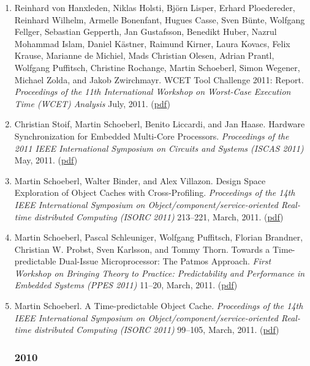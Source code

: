 \begin{enumerate}
\item Reinhard von Hanxleden, Niklas Holsti, Bj{\"o}rn Lisper, Erhard Ploedereder, Reinhard Wilhelm, Armelle Bonenfant, Hugues Casse, Sven B{\"u}nte, Wolfgang Fellger, Sebastian Gepperth, Jan Gustafsson, Benedikt Huber, Nazrul Mohammad Islam, Daniel K{\"a}stner, Raimund Kirner, Laura Kovacs, Felix Krause, Marianne de Michiel, Mads Christian Olesen, Adrian Prantl, Wolfgang Puffitsch, Christine Rochange, Martin Schoeberl, Simon Wegener, Michael Zolda, and Jakob Zwirchmayr.
 WCET Tool Challenge 2011: Report.
 \emph{Proceedings of the 11th International Workshop on Worst-Case Execution Time (WCET) Analysis} July, 2011.
(\href{http://www.jopdesign.com/doc/wcc2011.pdf}{pdf})

\item Christian Stoif, Martin Schoeberl, Benito Liccardi, and Jan Haase.
 Hardware Synchronization for Embedded Multi-Core Processors.
 \emph{Proceedings of the 2011 IEEE International Symposium on Circuits and Systems (ISCAS 2011)} May, 2011.
(\href{http://www.jopdesign.com/doc/SynMCPs.pdf}{pdf})

\item Martin Schoeberl, Walter Binder, and Alex Villazon.
 Design Space Exploration of Object Caches with Cross-Profiling.
 \emph{Proceedings of the 14th IEEE International Symposium on Object/component/service-oriented Real-time distributed Computing (ISORC 2011)} 213--221, March, 2011.
(\href{http://www.jopdesign.com/doc/profocache.pdf}{pdf})

\item Martin Schoeberl, Pascal Schleuniger, Wolfgang Puffitsch, Florian Brandner, Christian W. Probst, Sven Karlsson, and Tommy Thorn.
 Towards a Time-predictable Dual-Issue Microprocessor: The Patmos Approach.
 \emph{First Workshop on Bringing Theory to Practice: Predictability and Performance in Embedded Systems (PPES 2011)} 11--20, March, 2011.
(\href{http://www.jopdesign.com/doc/patmos_ppes.pdf}{pdf})

\item Martin Schoeberl.
 A Time-predictable Object Cache.
 \emph{Proceedings of the 14th IEEE International Symposium on Object/component/service-oriented Real-time distributed Computing (ISORC 2011)} 99--105, March, 2011.
(\href{http://www.jopdesign.com/doc/ocache.pdf}{pdf})


\subsubsection*{2010}


\end{enumerate}
